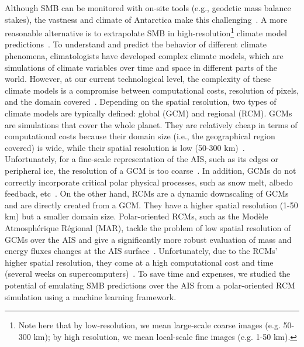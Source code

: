 \documentclass[a4paper,11pt,oneside]{report}
\begin{document}
    
Although SMB can be monitored with on-site tools (e.g., geodetic mass balance stakes), the vastness and climate of Antarctica make this challenging~\cite{Lenaerts2019}. A more reasonable alternative is to extrapolate SMB in high-resolution\footnote{Note here that by low-resolution, we mean large-scale coarse images (e.g. 50-300 \si{km}); by high resolution, we mean local-scale fine images (e.g. 1-50 \si{km}).} climate model predictions~\cite{Mottram}. To understand and predict the behavior of different climate phenomena, climatologists have developed complex climate models, which are simulations of climate variables over time and space in different parts of the world. However, at our current technological level, the complexity of these climate models is a compromise between computational costs, resolution of pixels, and the domain covered~\cite{Doury}. Depending on the spatial resolution, two types of climate models are typically defined: global (GCM) and regional (RCM). GCMs are simulations that cover the whole planet. They are relatively cheap in terms of computational costs because their domain size (i.e., the geographical region covered) is wide, while their spatial resolution is low (50-300 \si{km})~\cite{Doury}. Unfortunately, for a fine-scale representation of the AIS, such as its edges or peripheral ice, the resolution of a GCM is too coarse~\cite{Kittel, Seroussi}. In addition, GCMs do not correctly incorporate critical polar physical processes, such as snow melt, albedo feedback, etc~\cite{Kittel, Lenaerts2016}. On the other hand, RCMs are a dynamic downscaling of GCMs and are directly created from a GCM. They have a higher spatial resolution (1-50 \si{km}) but a smaller domain size. Polar-oriented RCMs, such as the Modèle Atmosphérique Régional (MAR), tackle the problem of low spatial resolution of GCMs over the AIS and give a significantly more robust evaluation of mass and energy fluxes changes at the AIS surface~\cite{Kittel, Fyke2018}. Unfortunately, due to the RCMs' higher spatial resolution, they come at a high computational cost and time (several weeks on supercomputers)~\cite{Doury}. To save time and expenses, we studied the potential of emulating SMB predictions over the AIS from a polar-oriented RCM simulation using a machine learning framework. 


    
\end{document}
